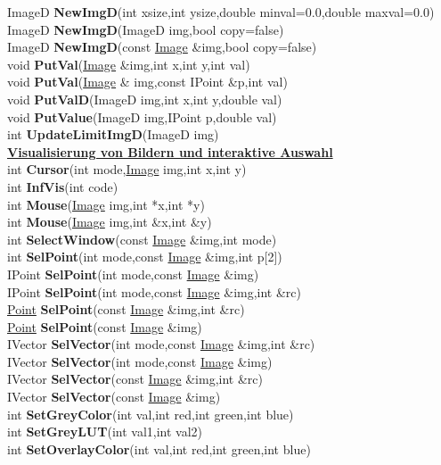 \documentclass[10pt,titlepage]{article}
\newcommand{\subtitle}[1]{{\noindent\bf#1}}
\def\functionlistentry#1#2#3#4#5#6{\noindent #1 {\bf #2}(#3) \dotfill #6\\}
\begin{document}
{{\functionlistentry{ImageD}{NewImgD}{int xsize,int ysize,double minval=0.0,double maxval=0.0}{77}{Images}{}
\functionlistentry{ImageD}{NewImgD}{ImageD img,bool copy=false}{78}{Images}{}
\functionlistentry{ImageD}{NewImgD}{const \hyperlink{Image}{Image} \&img,bool copy=false}{79}{Images}{}
\functionlistentry{void}{PutVal}{\hyperlink{Image}{Image} \&img,int x,int y,int val}{64}{Images}{}
\functionlistentry{void}{PutVal}{\hyperlink{Image}{Image} \& img,const IPoint \&p,int val}{67}{Images}{}
\functionlistentry{void}{PutValD}{ImageD img,int x,int y,double val}{80}{Images}{}
\functionlistentry{void}{PutValue}{ImageD img,IPoint p,double val}{82}{Images}{}
\functionlistentry{int}{UpdateLimitImgD}{ImageD img}{84}{Images}{}

\subtitle{\hyperlink{SECTION:Visualisierung}{Visualisierung von Bildern und interaktive Auswahl}}\\
\functionlistentry{int}{Cursor}{int mode,\hyperlink{Image}{Image} img,int x,int y}{95}{Visualisierung}{}
\functionlistentry{int}{InfVis}{int code}{99}{Visualisierung}{}
\functionlistentry{int}{Mouse}{\hyperlink{Image}{Image} img,int *x,int *y}{100}{Visualisierung}{}
\functionlistentry{int}{Mouse}{\hyperlink{Image}{Image} img,int \&x,int \&y}{101}{Visualisierung}{}
\functionlistentry{int}{SelectWindow}{const \hyperlink{Image}{Image} \&img,int mode}{111}{Visualisierung}{}
\functionlistentry{int}{SelPoint}{int mode,const \hyperlink{Image}{Image} \&img,int p[2]}{102}{Visualisierung}{}
\functionlistentry{IPoint}{SelPoint}{int mode,const \hyperlink{Image}{Image} \&img}{103}{Visualisierung}{}
\functionlistentry{IPoint}{SelPoint}{int mode,const \hyperlink{Image}{Image} \&img,int \&rc}{104}{Visualisierung}{}
\functionlistentry{\hyperlink{Point}{Point}}{SelPoint}{const \hyperlink{Image}{Image} \&img,int \&rc}{105}{Visualisierung}{}
\functionlistentry{\hyperlink{Point}{Point}}{SelPoint}{const \hyperlink{Image}{Image} \&img}{106}{Visualisierung}{}
\functionlistentry{IVector}{SelVector}{int mode,const \hyperlink{Image}{Image} \&img,int \&rc}{107}{Visualisierung}{}
\functionlistentry{IVector}{SelVector}{int mode,const \hyperlink{Image}{Image} \&img}{108}{Visualisierung}{}
\functionlistentry{IVector}{SelVector}{const \hyperlink{Image}{Image} \&img,int \&rc}{109}{Visualisierung}{}
\functionlistentry{IVector}{SelVector}{const \hyperlink{Image}{Image} \&img}{110}{Visualisierung}{}
\functionlistentry{int}{SetGreyColor}{int val,int red,int green,int blue}{96}{Visualisierung}{}
\functionlistentry{int}{SetGreyLUT}{int val1,int val2}{97}{Visualisierung}{}
\functionlistentry{int}{SetOverlayColor}{int val,int red,int green,int blue}{98}{Visualisierung}{}
}}
\end{document}
